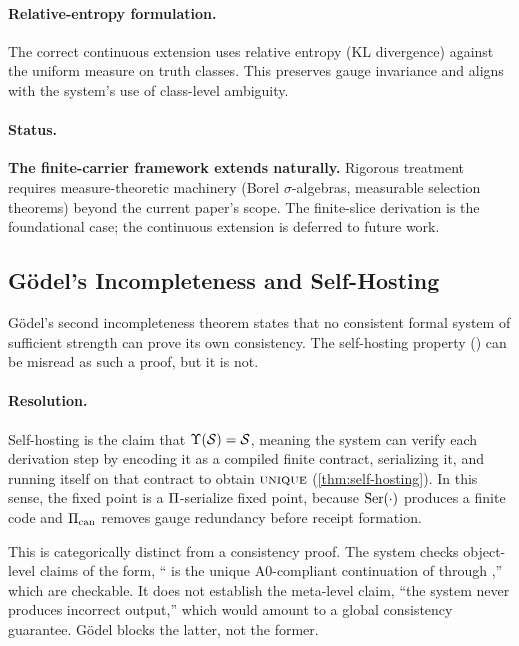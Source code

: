 \paragraph{Relative-entropy formulation.}
The correct continuous extension uses relative entropy (KL divergence)
against the uniform measure on truth classes.  This preserves gauge
invariance and aligns with the system's use of class-level ambiguity.

\paragraph{Status.}
\textbf{The finite-carrier framework extends naturally.}  Rigorous
treatment requires measure-theoretic machinery (Borel $\sigma$-algebras,
measurable selection theorems) beyond the current paper's scope.  The
finite-slice derivation is the foundational case; the continuous
extension is deferred to future work.

\subsection{G\"{o}del's Incompleteness and Self-Hosting}
\label{app:oq:godel}

G\"{o}del's second incompleteness theorem \citep{godel1931} states that no
consistent formal system of sufficient strength can prove its own
consistency.  The self-hosting property () can be misread as such
a proof, but it is not.

\paragraph{Resolution.}
Self-hosting is the claim that $\Upsilon(\mathcal{S}) = \mathcal{S}$,
meaning the system can verify each derivation step by encoding it as a
compiled finite contract, serializing it, and running itself on that
contract to obtain $\textsc{unique}$ (\cref{thm:self-hosting}).  In this sense,
the fixed point is a $\Pi$-serialize fixed point, because
$\mathrm{Ser}(\cdot)$ produces a finite code and $\Pi_{\mathrm{can}}$ removes gauge
redundancy before receipt formation.

This is categorically distinct from a consistency proof.  The system checks
object-level claims of the form, `` is the unique A0-compliant
continuation of  through ,'' which are checkable.
It does not establish the meta-level claim, ``the system never produces
incorrect output,'' which would amount to a global consistency guarantee.
G\"{o}del blocks the latter, not the former.

